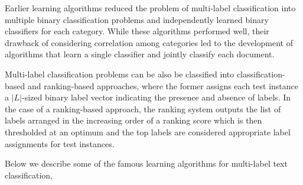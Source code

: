 Earlier learning algorithms reduced the problem of multi-label classification into multiple binary classification problems and independently learned binary classifiers for each category. While these algorithms performed well, their drawback of considering correlation among categories led to the development of algorithms that learn a single classifier and jointly classify each document. 

Multi-label classification problems can be also be classified into classification-based and ranking-based approaches, where the former assigns each test instance a $|L|$-sized binary label vector indicating the presence and absence of labels. In the case of a ranking-based approach, the ranking system outputs the list of labels arranged in the increasing order of a ranking score which is then thresholded at an optimum and the top labels are considered appropriate label assignments for test instances.

Below we describe some of the famous learning algorithms for multi-label text classification, 

